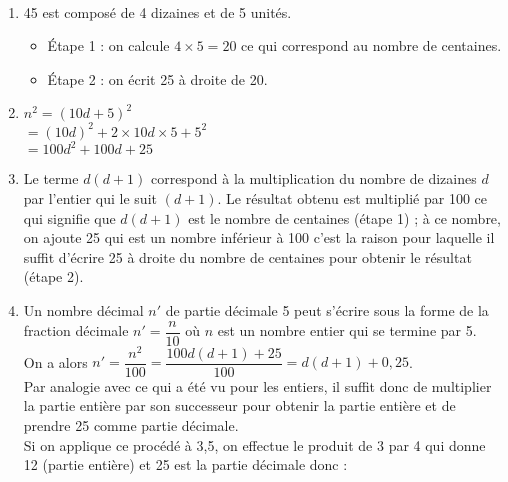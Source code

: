 \ \\ [-5mm]
\begin{enumerate}
   \item 45 est composé de 4 dizaines et de 5 unités.
   \begin{itemize}
      \item Étape 1 : on calcule $4\times5 =20$ ce qui correspond au nombre de centaines.
      \item Étape 2 : on écrit 25 à droite de 20.
   \end{itemize}
   \item $n^2 =(10d+5)^2$ \\
   \hspace*{0.8cm} $=(10d)^2+2\times10d\times5+5^2$ \\
   \hspace*{0.8cm} $=100d^2+100d+25$ \\
   \hspace*{0.4cm} 
   \item Le terme \og $d(d+1)$ \fg{} correspond à la multiplication du nombre de dizaines $d$ par l'entier qui le suit $(d+1)$. Le résultat obtenu est multiplié par 100 ce qui signifie que $d(d+1)$ est le nombre de centaines (étape 1) ; à ce nombre, on ajoute 25 qui est un nombre inférieur à 100 c'est la raison pour laquelle il suffit d'écrire 25 à droite du nombre de centaines pour obtenir le résultat (étape 2).
   \item Un nombre décimal $n'$ de partie décimale 5 peut s'écrire sous la forme de la fraction décimale $n' =\dfrac{n}{10}$ où $n$ est un nombre entier qui se termine par 5. \\
   On a alors $n' =\dfrac{n^2}{100} =\dfrac{100d(d+1)+25}{100} =d(d+1)+0,25$. \\ [1mm]
   Par analogie avec ce qui a été vu pour les entiers, il suffit donc de multiplier la partie entière par son successeur pour obtenir la partie entière et de prendre 25 comme partie décimale. \\
   Si on applique ce procédé à 3,5, on effectue le produit de 3 par 4 qui donne 12 (partie entière) et 25 est la partie décimale donc : 
\end{enumerate}
